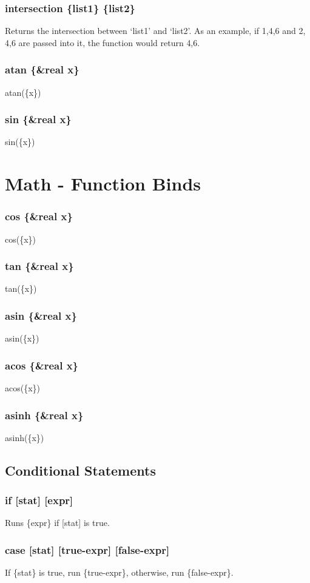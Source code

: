 \documentclass{article}
\begin{document}
	\subsubsection{intersection \{list1\} \{list2\}}
	
	Returns the intersection between `list1' and `list2'. As an example, if {1,4,6} and {2, 4,6} are passed into it, the function would return {4,6}.
	
	\subsubsection{atan \{\&real x\}}
	
	atan(\{x\})
	
	\subsubsection{sin \{\&real x\}}
	
	sin(\{x\})
	
	\section{Math - Function Binds}

	\subsubsection{cos \{\&real x\}}
	
	cos(\{x\})
	
	\subsubsection{tan \{\&real x\}}
	
	tan(\{x\})
	
	\subsubsection{asin \{\&real x\}}
	
	asin(\{x\})
	
	\subsubsection{acos \{\&real x\}}
	
	acos(\{x\})
	
	\subsubsection{asinh \{\&real x\}}
	
	asinh(\{x\})
	
	\subsection{Conditional Statements}
	
	\subsubsection{if [stat] [expr]}
	
	Runs \{expr\} if [stat] is true.
	
	\subsubsection{case [stat] [true-expr] [false-expr]}
	
	If \{stat\} is true, run \{true-expr\}, otherwise, run \{false-expr\}.
\end{document}
